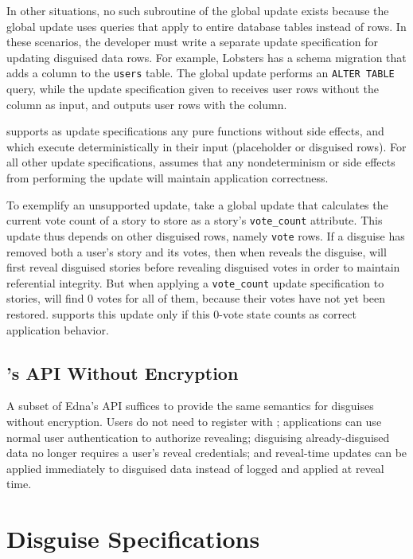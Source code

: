 %
    In other situations, no such subroutine of the global update exists because
    the global update uses queries that apply to entire database tables instead
    of rows.  In these scenarios, the developer must write a separate update
    specification for updating disguised data rows.
%
    For example, Lobsters has a schema migration that adds a column to the
    \texttt{users} table.  The global update performs an \texttt{ALTER TABLE}
    query, while the update specification given to \sys receives user rows
    without the column as input, and outputs user rows with the column.
%

\sys supports as update specifications any pure functions without side effects,
and which execute deterministically in their input (placeholder or disguised
rows).
%
For all other update specifications, \sys assumes that any nondeterminism or side effects from performing the
    update will maintain application correctness.

%
    To exemplify an unsupported update, take a global update that calculates the
    current vote count of a story to store as a story's \texttt{vote\_count}
    attribute. 
%
    This update thus depends on other disguised rows, namely \texttt{vote} rows.
%
    If a disguise has removed both a user's story and its votes, then when \sys
    reveals the disguise, \sys will first reveal disguised stories before
    revealing disguised votes in order to maintain referential integrity. 
%
    But when applying a \texttt{vote\_count} update specification to stories,
    \sys will find 0 votes for all of them, because their votes have not yet
    been restored.
%
    \sys supports this update only if this 0-vote state counts as correct
    application behavior.
%

    
\subsection{\sys's API Without Encryption}
\label{s:noencrypt-api}
A subset of Edna's API suffices to provide the same semantics for disguises
without encryption. Users do not need to register with \sys; applications can
use normal user authentication to authorize revealing; disguising
already-disguised data no longer requires a user's reveal credentials; and
reveal-time updates can be applied immediately to disguised data instead of
logged and applied at reveal time.

\section{Disguise Specifications}
\label{s:semantics:spec}

